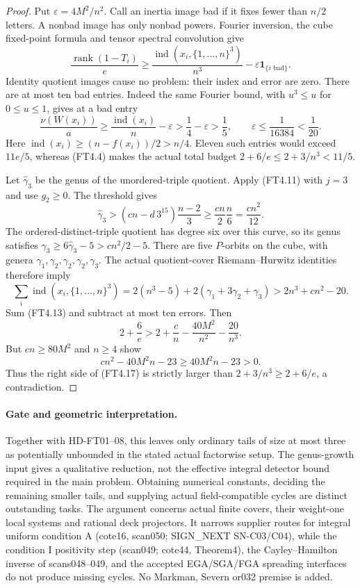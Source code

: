 \begin{proof}
Put $\varepsilon=4M^2/n^2$. Call an inertia image bad if it fixes fewer
than $n/2$ letters. A nonbad image has only nonbad powers. Fourier inversion,
the cube fixed-point formula and tensor spectral convolution give
\[
 \frac{\operatorname{rank}(1-T_i)}e
 \ge\frac{\operatorname{ind}(x_i,\{1,\ldots,n\}^3)}{n^3}
                -\varepsilon\mathbf1_{\{i\text{ bad}\}}.
 \tag{FT4.13}
\]
Identity quotient images cause no problem: their index and error are zero.
There are at most ten bad entries. Indeed the same Fourier bound, with
$u^3\le u$ for $0\le u\le1$, gives at a bad entry
\[
 \frac{\nu(W(x_i))}{a}
 \ge\frac{\operatorname{ind}(x_i)}n-\varepsilon
 >\frac14-\varepsilon>\frac15,
 \qquad \varepsilon\le\frac1{16384}<\frac1{20}.
 \tag{FT4.14}
\]
Here $\operatorname{ind}(x_i)\ge(n-f(x_i))/2>n/4$.
Eleven such entries would exceed $11e/5$, whereas (FT4.4) makes the
actual total budget $2+6/e\le2+3/n^3<11/5$.

Let $\widehat\gamma_3$ be the genus of the unordered-triple quotient.
Apply (FT4.11) with $j=3$ and use $g_2\ge0$. The threshold gives
\[
 \widehat\gamma_3>
   (cn-d\,3^{15})\frac{n-2}{3}
       \ge\frac{cn}{2}\frac n6=\frac{cn^2}{12}.
 \tag{FT4.15}
\]
The ordered-distinct-triple quotient has degree six over this curve, so
its genus satisfies $\gamma_3\ge6\widehat\gamma_3-5>cn^2/2-5$.
There are five $P$-orbits on the cube, with genera
$\gamma_1,\gamma_2,\gamma_2,\gamma_2,\gamma_3$.
The actual quotient-cover Riemann--Hurwitz identities therefore imply
\[
 \sum_i\operatorname{ind}(x_i,\{1,\ldots,n\}^3)
 =2(n^3-5)+2(\gamma_1+3\gamma_2+\gamma_3)
 >2n^3+cn^2-20.
 \tag{FT4.16}
\]
Sum (FT4.13) and subtract at most ten errors. Then
\[
 2+\frac6e>2+\frac cn-\frac{40M^2}{n^2}-\frac{20}{n^3}.
 \tag{FT4.17}
\]
But $cn\ge80M^2$ and $n\ge4$ show
\[
 cn^2-40M^2n-23\ge40M^2n-23>0.
 \tag{FT4.18}
\]
Thus the right side of (FT4.17) is strictly larger than
$2+3/n^3\ge2+6/e$, a contradiction.
\end{proof}

\paragraph{Gate and geometric interpretation.}
Together with HD-FT01--08, this leaves only ordinary tails of size at most
three as potentially unbounded in the stated actual factorwise setup.
The genus-growth input gives a qualitative reduction, not the effective
integral detector bound required in the main problem. Obtaining numerical
constants, deciding the remaining smaller tails, and supplying actual
field-compatible cycles are distinct outstanding tasks.
The argument concerns actual finite covers, their weight-one local systems
and rational deck projectors. It narrows supplier routes for integral
uniform condition A (cote16, scan050; SIGN\_NEXT SN-C03/C04), while the
condition I positivity step (scan049; cote44, Theorem4), the Cayley--Hamilton
inverse of scans048--049, and the accepted EGA/SGA/FGA spreading interfaces
do not produce missing cycles. No Markman, Severn or032 premise is added.
